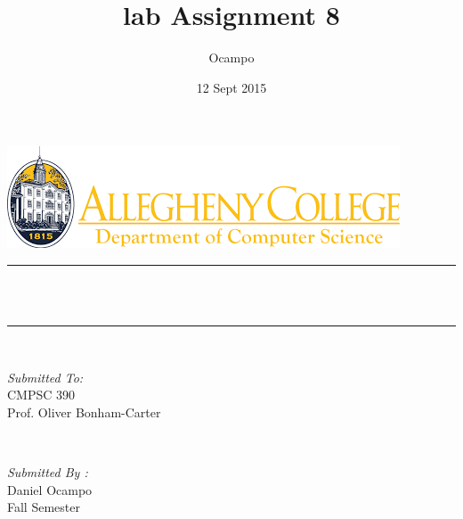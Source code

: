 \documentclass[12pt]{article}
\title{lab Assignment 8}								%
\author{Ocampo}								%
\date{12 Sept 2015}											%
\makeatletter
\let\thetitle\@title
\makeatother
\begin{document}

\begin{titlepage}
	\centering
    \vspace*{0.5 cm}
    \includegraphics[scale = 0.75]{pictures.png}\\[1.0 cm]	%
	\rule{\linewidth}{0.2 mm} \\[0.4 cm]
	{ \huge \bfseries \thetitle}\\
	\rule{\linewidth}{0.2 mm} \\[1.5 cm]
	
	\begin{minipage}{0.4\textwidth}
		\begin{flushleft} \large
			\emph{Submitted To:}\\
			CMPSC 390\\
             Prof. Oliver Bonham-Carter\\
            
			\end{flushleft}
			\end{minipage}~
			\begin{minipage}{0.4\textwidth}
            
			\begin{flushright} \large
			\emph{Submitted By :} \\
			Daniel Ocampo\\
 
            Fall Semester  \\
		\end{flushright}
		
	
        
	\end{minipage}\\[2 cm]
	
	
\end{titlepage}


\tableofcontents
\pagebreak

\end{document}

